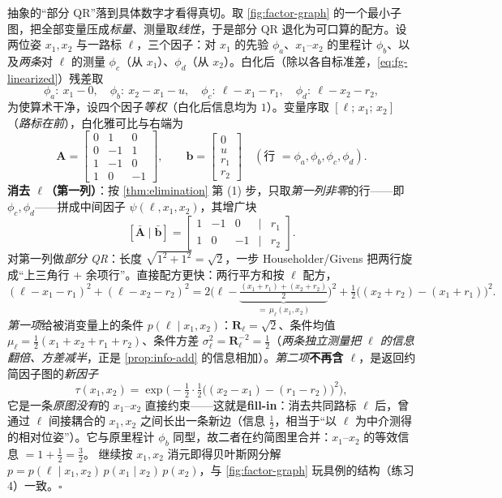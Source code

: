 \begin{derivation}
\label{der:est-elim-numeric}
抽象的“部分 QR”落到具体数字才看得真切。取 \cref{fig:factor-graph} 的一个最小子图，把全部变量压成\emph{标量}、测量取\emph{线性}，于是部分 QR 退化为可口算的配方。设两位姿 $x_1,x_2$ 与一路标 $\ell$，三个因子：对 $x_1$ 的先验 $\phi_a$、$x_1$–$x_2$ 的里程计 $\phi_b$、以及\emph{两条}对 $\ell$ 的测量 $\phi_c$（从 $x_1$）、$\phi_d$（从 $x_2$）。白化后（除以各自标准差，\cref{eq:fg-linearized}）残差取
\[
  \phi_a:\ x_1-0,\quad
  \phi_b:\ x_2-x_1-u,\quad
  \phi_c:\ \ell-x_1-r_1,\quad
  \phi_d:\ \ell-x_2-r_2,
\]
为使算术干净，设四个因子\emph{等权}（白化后信息均为 $1$）。变量序取 $[\ell;\,x_1;\,x_2]$（\emph{路标在前}），白化雅可比与右端为
\[
  \mathbf{A}=\begin{bmatrix}0&1&0\\0&-1&1\\1&-1&0\\1&0&-1\end{bmatrix},\qquad
  \mathbf{b}=\begin{bmatrix}0\\u\\r_1\\r_2\end{bmatrix}
  \quad(\text{行 }=\phi_a,\phi_b,\phi_c,\phi_d).
\]
\textbf{消去 $\ell$（第一列）}：按 \cref{thm:elimination} 第 (1) 步，只取\emph{第一列非零}的行——即 $\phi_c,\phi_d$——拼成中间因子 $\psi(\ell,x_1,x_2)$，其增广块
\[
  [\bar{\mathbf{A}}\mid\bar{\mathbf{b}}]=\begin{bmatrix}1&-1&0&\mid&r_1\\1&0&-1&\mid&r_2\end{bmatrix}.
\]
对第一列做\emph{部分 QR}：长度 $\sqrt{1^2+1^2}=\sqrt2$，一步 Householder/Givens 把两行旋成“上三角行 $+$ 余项行”。直接配方更快：两行平方和按 $\ell$ 配方，
\[
  (\ell-x_1-r_1)^2+(\ell-x_2-r_2)^2
  =2\Big(\ell-\underbrace{\tfrac{(x_1+r_1)+(x_2+r_2)}{2}}_{=\,\mu_\ell(x_1,x_2)}\Big)^2
  +\tfrac12\big((x_2+r_2)-(x_1+r_1)\big)^2 .
\]
\emph{第一项}给被消变量上的条件 $p(\ell\mid x_1,x_2)$：$\mathbf{R}_\ell=\sqrt2$、条件均值 $\mu_\ell=\tfrac12(x_1+x_2+r_1+r_2)$、条件方差 $\sigma_\ell^2=\mathbf{R}_\ell^{-2}=\tfrac12$（\emph{两条独立测量把 $\ell$ 的信息翻倍、方差减半}，正是 \cref{prop:info-add} 的信息相加）。\emph{第二项}\textbf{不再含 $\ell$}，是返回约简因子图的\emph{新因子}
\[
  \tau(x_1,x_2)=\exp\!\Big(-\tfrac12\cdot\tfrac12\big((x_2-x_1)-(r_1-r_2)\big)^2\Big),
\]
它是一条\emph{原图没有}的 $x_1$–$x_2$ 直接约束——这就是\textbf{fill-in}：消去共同路标 $\ell$ 后，曾通过 $\ell$ 间接耦合的 $x_1,x_2$ 之间长出一条新边（信息 $\tfrac12$，相当于“以 $\ell$ 为中介测得的相对位姿”）。它与原里程计 $\phi_b$ 同型，故二者在约简图里合并：$x_1$–$x_2$ 的等效信息 $=1+\tfrac12=\tfrac32$。
继续按 $x_1,x_2$ 消元即得贝叶斯网分解 $p=p(\ell\mid x_1,x_2)\,p(x_1\mid x_2)\,p(x_2)$，与 \cref{fig:factor-graph} 玩具例的结构（练习 4）一致。\hfill$\square$
\end{derivation}

